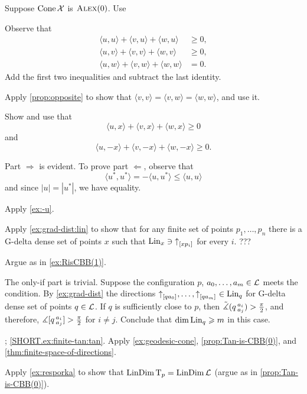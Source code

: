  Suppose $\mathop{\rm Cone}\nolimits\mathcal{X}$ is $\textsc{Alex}(0)$.
Use 

Observe that
\begin{align*}
\langle u,u\rangle+\langle v,u\rangle+\langle w,u\rangle &\ge 0,
\\
\langle u,v\rangle+\langle v,v\rangle+\langle w,v\rangle &\ge 0,
\\
\langle u,w\rangle+\langle v,w\rangle+\langle w,w\rangle &= 0.
\end{align*}
Add the first two inequalities and subtract the last identity.

Apply \ref{prop:opposite} to show that 
$\langle v,v\rangle =\langle v,w\rangle=\langle w,w\rangle$,
and use it.

 Show and use that
\[\langle u,x\rangle +\langle v,x\rangle +\langle w,x\rangle \ge 0\]
and
\[\langle u,-x\rangle +\langle v,-x\rangle +\langle w,-x\rangle \ge 0.\]

 Part $\Rightarrow$ is evident.
To prove part $\Leftarrow$, observe that 
\[\langle u^*,u^*\rangle =-\langle u,u^*\rangle\le \langle u,u\rangle\]
and since $|u|=|u^*|$, we have equality.

Apply \ref{ex:-u}.

Apply \ref{ex:grad-dist:lin} to show that for any finite set of points $p_1,\dots,p_n$ there is a G-delta dense set of points $x$ such that $\mathop{\rm Lin}\nolimits_x\ni {\uparrow}_{[{x}{p_i}]_{{}}}$ for every $i$.
???

 Argue as in \ref{ex:RisCBB(1)}.

 The only-if part is trivial.
Suppose the configuration $p$, $a_0,\z\dots, a_{m}\in \spc{L}$ meets the condition.
By \ref{ex:grad-dist} the directions $\dir q{a_0},\z\dots,\dir q{a_m}\in \Lin_q$ for G-delta dense set of points $q\in \mathcal{L}$.
If $q$ is sufficiently close to $p$, then $\tilde\measuredangle(q\,{}^{a_i}_{a_j})>\tfrac\pi2$,
and therefore, $\measuredangle[q\,{}^{a_i}_{a_j}]>\tfrac\pi2$ for $i\ne j$.
Conclude that $\operatorname{\rm dim}\nolimits\mathop{\rm Lin}\nolimits_q\geqslant m$ in this case.

\parbf{\ref{ex:finite-tan}}; 
\ref{SHORT.ex:finite-tan:tan}. Apply \ref{ex:geodesic-cone}, \ref{prop:Tan-is-CBB(0)}, and \ref{thm:finite-space-of-directions}.

Apply \ref{ex:resporka} to show that $\mathop{\rm LinDim}\nolimits\mathrm{T}_p=\mathop{\rm LinDim}\nolimits\mathcal{L}$ (argue as in \ref{prop:Tan-is-CBB(0)}).

